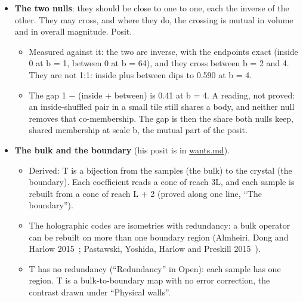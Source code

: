\begin{itemize}
\begin{itemize}
\item Derived: E is a sum over edges, and a departure is linear in E and in the draws' sums. The departure of a whole is the sum of its edges' departures, exactly: the integral of its constituents, with the edge as the constituent. The whole equals its tiles plus its seams at every tile size (proved).
\item Built: each body's curve over its box, the six bounds xmax, xmin, ymax, ymin, zmax and zmin.
\end{itemize}
\item \textbf{The two nulls}: they should be close to one to one, each the inverse of the other. They may cross, and where they do, the crossing is mutual in volume and in overall magnitude. Posit.

\begin{itemize}
\item Measured against it: the two are inverse, with the endpoints exact (inside 0 at b = 1, between 0 at b = 64), and they cross between b = 2 and 4. They are not 1:1: inside plus between dips to 0.590 at b = 4.
\item The gap 1 − (inside + between) is 0.41 at b = 4. A reading, not proved: an inside-shuffled pair in a small tile still shares a body, and neither null removes that co-membership. The gap is then the share both nulls keep, shared membership at scale b, the mutual part of the posit.
\end{itemize}
\item \textbf{The bulk and the boundary} (his posit is in \hyperref[chap:wants]{wants.md}).

\begin{itemize}
\item Derived: T is a bijection from the samples (the bulk) to the crystal (the boundary). Each coefficient reads a cone of reach 3L, and each sample is rebuilt from a cone of reach L + 2 (proved along one line, “The boundary”).
\item The holographic codes are isometries with redundancy: a bulk operator can be rebuilt on more than one boundary region (Almheiri, Dong and Harlow 2015~\cite{src:Almheiri-Dong-and-Harlow-2015}; Pastawski, Yoshida, Harlow and Preskill 2015~\cite{src:Pastawski-Yoshida-Harlow-and-Preskill-2015}).
\item T has no redundancy (“Redundancy” in Open): each sample has one region. T is a bulk-to-boundary map with no error correction, the contrast drawn under “Physical walls”.
\end{itemize}
\end{itemize}

